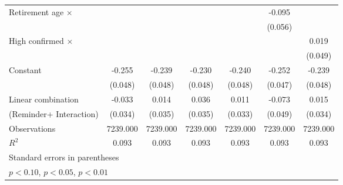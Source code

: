 {\begin{tabular}{l*{6}{c}}
\addlinespace
Retirement age $\times$&                     &                     &                     &                     &      -0.095\sym{*}  &                     \\
                    &                     &                     &                     &                     &     (0.056)         &                     \\
\addlinespace
High confirmed $\times$&                     &                     &                     &                     &                     &       0.019         \\
                    &                     &                     &                     &                     &                     &     (0.049)         \\
\addlinespace
Constant            &      -0.255\sym{***}&      -0.239\sym{***}&      -0.230\sym{***}&      -0.240\sym{***}&      -0.252\sym{***}&      -0.239\sym{***}\\
                    &     (0.048)         &     (0.048)         &     (0.048)         &     (0.048)         &     (0.047)         &     (0.048)         \\
\midrule
Linear combination  &      -0.033         &       0.014         &       0.036         &       0.011         &      -0.073         &       0.015         \\
(Reminder+ Interaction)&     (0.034)         &     (0.035)         &     (0.035)         &     (0.033)         &     (0.049)         &     (0.034)         \\
Observations        &    7239.000         &    7239.000         &    7239.000         &    7239.000         &    7239.000         &    7239.000         \\
\(R^{2}\)           &       0.093         &       0.093         &       0.093         &       0.093         &       0.093         &       0.093         \\
\bottomrule
\multicolumn{7}{l}{\footnotesize Standard errors in parentheses}\\
\multicolumn{7}{l}{\footnotesize \sym{*} \(p<0.10\), \sym{**} \(p<0.05\), \sym{***} \(p<0.01\)}\\
\end{tabular}
}
